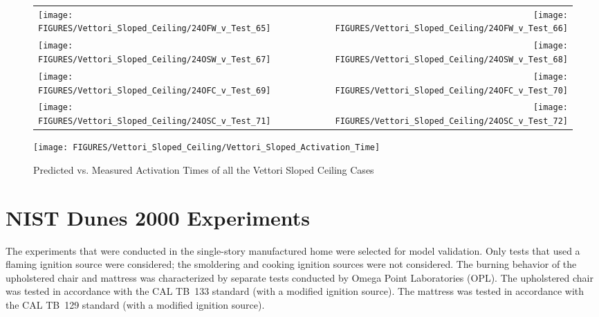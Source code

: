 \begin{figure}[p]
\begin{tabular*}{\textwidth}{l@{\extracolsep{\fill}}r}
\texttt{[image: FIGURES/Vettori\_Sloped\_Ceiling/24OFW\_v\_Test\_65]} &
\texttt{[image: FIGURES/Vettori\_Sloped\_Ceiling/24OFW\_v\_Test\_66]} \\
\texttt{[image: FIGURES/Vettori\_Sloped\_Ceiling/24OSW\_v\_Test\_67]} &
\texttt{[image: FIGURES/Vettori\_Sloped\_Ceiling/24OSW\_v\_Test\_68]} \\
\texttt{[image: FIGURES/Vettori\_Sloped\_Ceiling/24OFC\_v\_Test\_69]} &
\texttt{[image: FIGURES/Vettori\_Sloped\_Ceiling/24OFC\_v\_Test\_70]} \\
\texttt{[image: FIGURES/Vettori\_Sloped\_Ceiling/24OSC\_v\_Test\_71]} &
\texttt{[image: FIGURES/Vettori\_Sloped\_Ceiling/24OSC\_v\_Test\_72]} \\
\end{tabular*}
\label{Vettori_Sloped_9}
\end{figure}

\begin{figure}[p]
\begin{center}
\texttt{[image: FIGURES/Vettori\_Sloped\_Ceiling/Vettori\_Sloped\_Activation\_Time]}
\end{center}
\caption{Predicted vs. Measured Activation Times of all the Vettori Sloped Ceiling Cases}
\label{Vettori_Sloped_Activation}
\end{figure}

\clearpage

\section{NIST Dunes 2000 Experiments}

The experiments that were conducted in the single-story manufactured home were selected for model validation.
Only tests that used a flaming ignition source were considered; the smoldering and cooking ignition sources
were not considered. The burning behavior of the upholstered chair and mattress was characterized
by separate tests conducted by Omega Point Laboratories (OPL).
The upholstered chair was tested in accordance with the CAL TB~133 standard (with a modified ignition source).
The mattress was tested in accordance with the CAL TB~129 standard (with a modified ignition source).

